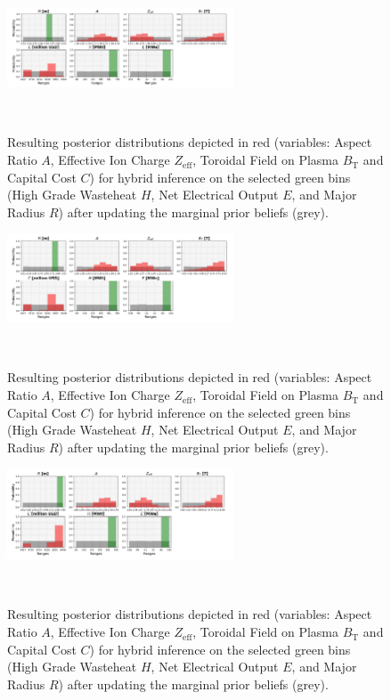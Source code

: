 \begin{figure}[!b]
    \centering
    \includegraphics[width=0.6\textwidth]{figures/TE_results/march_data/config(57)_outputs(3)_hybrid6.png}
    \caption{Resulting posterior distributions depicted in red (variables: Aspect Ratio $A$, Effective Ion Charge $Z_{\text{eff}}$, Toroidal Field on Plasma $B_{\text{T}}$ and Capital Cost $C$) for hybrid inference on the selected green bins (High Grade Wasteheat $H$, Net Electrical Output $E$, and Major Radius $R$) after updating the marginal prior beliefs (grey).}~\label{fig:config(57)_outputs(3)_hybrid6}
\end{figure}

\begin{figure}[!b]
    \centering
    \includegraphics[width=0.6\textwidth]{figures/TE_results/march_data/config(57)_outputs(3)_hybrid7.png}
    \caption{Resulting posterior distributions depicted in red (variables: Aspect Ratio $A$, Effective Ion Charge $Z_{\text{eff}}$, Toroidal Field on Plasma $B_{\text{T}}$ and Capital Cost $C$) for hybrid inference on the selected green bins (High Grade Wasteheat $H$, Net Electrical Output $E$, and Major Radius $R$) after updating the marginal prior beliefs (grey).}~\label{fig:config(57)_outputs(3)_hybrid7}
\end{figure}


\begin{figure}[!b]
    \centering
    \includegraphics[width=0.6\textwidth]{figures/TE_results/march_data/config(57)_outputs(3)_hybrid8.png}
    \caption{Resulting posterior distributions depicted in red (variables: Aspect Ratio $A$, Effective Ion Charge $Z_{\text{eff}}$, Toroidal Field on Plasma $B_{\text{T}}$ and Capital Cost $C$) for hybrid inference on the selected green bins (High Grade Wasteheat $H$, Net Electrical Output $E$, and Major Radius $R$) after updating the marginal prior beliefs (grey).}~\label{fig:config(57)_outputs(3)_hybrid8}
\end{figure}


